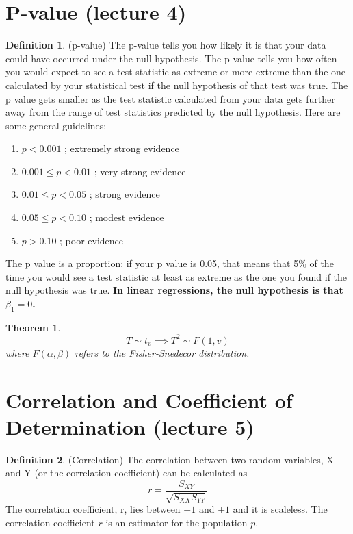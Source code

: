 \documentclass[12pt]{article}
\newtheorem{theorem}{Theorem}[section]
\theoremstyle{definition}
\newtheorem{definition}{Definition}[section]
\theoremstyle{remark}
\begin{document}
\section{P-value (lecture 4)}
    \begin{definition}(p-value)
        The p-value tells you how likely it is that your data could have occurred under the null 
        hypothesis. The p value tells you how often you would expect to see a test statistic 
        as extreme or more extreme than the one calculated by your statistical test if the null 
        hypothesis of that test was true. The p value gets smaller as the test statistic calculated
        from your data gets further away from the range of test statistics predicted by the null hypothesis.
        Here are some general guidelines:
        \begin{enumerate}
            \item $p<0.001$ ; extremely strong evidence
            \item $0.001\le p<0.01$ ; very strong evidence
            \item $0.01\le p<0.05$ ; strong evidence
            \item $0.05\le p<0.10$ ; modest evidence
            \item $p>0.10$ ; poor evidence
        \end{enumerate}
        \begin{example}
            The p value is a proportion: if your p value is 0.05, that means that 5\% of the time 
            you would see a test statistic at least as extreme as the one you found if the null 
            hypothesis was true. \textbf{In linear regressions, the null hypothesis is that $\beta_1=0$.}
        \end{example}
        \begin{theorem}
            $$T \sim t_v \implies T^2 \sim F(1,v)$$
            where $F(\alpha,\beta)$ refers to the Fisher-Snedecor distribution.
        \end{theorem}
    \end{definition}
\section{Correlation and Coefficient of Determination (lecture 5)}
\begin{definition}(Correlation)
    The correlation between two random variables, X and Y (or the correlation coefficient) can be calculated as
    \begin{equation}
        r = \frac{S_{XY}}{\sqrt{S_{XX}S_{YY}}}
    \end{equation}
    The correlation coefficient, r, lies between $-1$ and $+1$ and it is scaleless. The correlation 
    coefficient $r$ is an estimator for the population $p$.
\end{definition}
\end{document}

